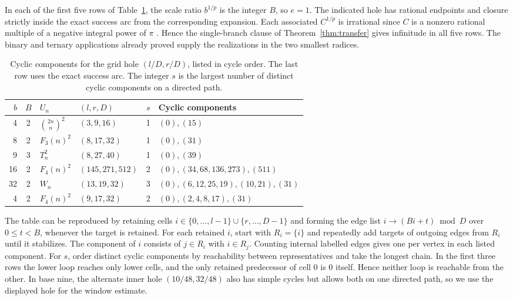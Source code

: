 \documentclass[11pt,reqno,a4paper]{amsart}
\theoremstyle{remark}
\begin{document}
In each of the first five rows of Table~\ref{tab:app-inner}, the
scale ratio \(b^{1/p}\) is the integer \(B\), so \(e=1\).
The indicated hole has rational endpoints and closure strictly
inside the exact success arc from the corresponding expansion.
Each associated \(C^{1/p}\) is irrational since \(C\) is a nonzero
rational multiple of a negative integral power of \(\pi\)
\cite{app-lindemann}. Hence the single-branch clause of
Theorem~\ref{thm:transfer} gives infinitude in all five rows. The
binary and ternary applications already proved supply the
realizations in the two smallest radices.

\begin{table}[ht]
\centering
\small
\begin{tabular}{@{}rcllcl@{}}
\toprule
\(b\) & \(B\) & \(U_n\) & \((l,r,D)\) & \(s\) & Cyclic components \\
\midrule
4  & 2 & \(\binom{2n}{n}^2\) & \((3,9,16)\)       & 1 & \((0), (15)\) \\
8  & 2 & \(F_3(n)^2\)        & \((8,17,32)\)      & 1 & \((0), (31)\) \\
9  & 3 & \(T_n^2\)           & \((8,27,40)\)      & 1 & \((0), (39)\) \\
16 & 2 & \(F_4(n)^2\)        & \((145,271,512)\)  & 2 & \((0), (34,68,136,273), (511)\) \\
32 & 2 & \(W_n\)             & \((13,19,32)\)     & 3 & \((0), (6,12,25,19), (10,21), (31)\) \\
4  & 2 & \(F_4(n)^2\)        & \((9,17,32)\)      & 2 & \((0), (2,4,8,17), (31)\) \\
\bottomrule
\end{tabular}
\caption{Cyclic components for the grid hole \((l/D,r/D)\), listed
in cycle order. The last row uses the exact success arc. The
integer \(s\) is the largest number of distinct cyclic components
on a directed path.}
\label{tab:app-inner}
\end{table}

The table can be reproduced by retaining cells
\(i\in\{0,\ldots,l-1\}\cup\{r,\ldots,D-1\}\) and forming the
edge list \(i\to(Bi+t)\bmod D\) over \(0\le t<B\), whenever the
target is retained. For each retained \(i\), start with \(R_i=\{i\}\)
and repeatedly add targets of outgoing edges from \(R_i\) until
it stabilizes. The component of \(i\) consists of \(j\in R_i\)
with \(i\in R_j\). Counting internal labelled edges gives one
per vertex in each listed component. For \(s\), order distinct
cyclic components by reachability between representatives and take
the longest chain. In the first three rows the lower loop reaches
only lower cells, and the only retained predecessor of cell \(0\)
is \(0\) itself. Hence neither loop is reachable from the other.
In base nine, the alternate inner hole \((10/48,32/48)\)
also has simple cycles but allows both on one directed path,
so we use the displayed hole for the window estimate.
\end{document}
